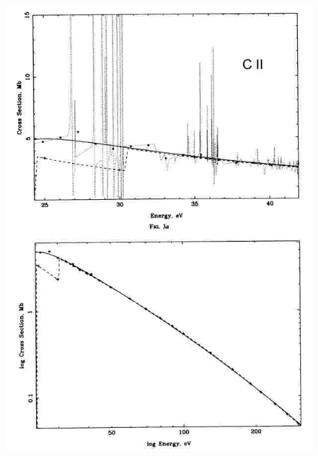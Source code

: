 \begin{frame}
\begin{minipage}[t]{0.49\textwidth}
\begin{center}
    \includegraphics[width=\textwidth,height=!]{./C/cii_photion.jpg}
  \end{center}
\end{minipage}



\end{frame}
